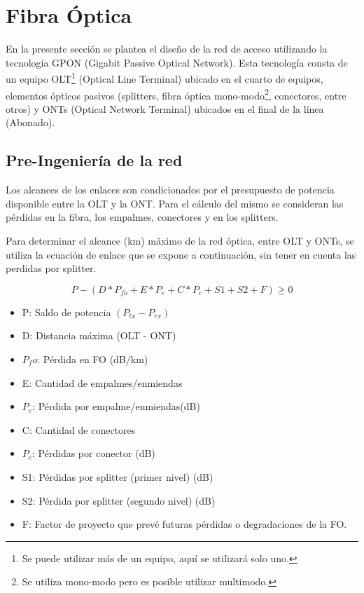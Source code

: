 \documentclass[12pt,a4paper]{book}
\begin{document}
\section{Fibra Óptica}\label{sec_fibra_optica_Acceso}

En la presente sección se plantea el diseño de la red de acceso utilizando la tecnología GPON (Gigabit Passive Optical Network). Esta tecnología consta de un equipo OLT\footnote{Se puede utilizar más de un equipo, aquí se utilizará solo uno.} (Optical Line Terminal) ubicado en el cuarto de equipos, elementos ópticos pasivos (splitters, fibra óptica mono-modo\footnote{Se utiliza mono-modo pero es posible utilizar multimodo.}, conectores, entre otros) y ONTs (Optical Network Terminal) ubicados en el final de la línea (Abonado).\medskip



\subsection{Pre-Ingeniería de la red}

Los alcances de los enlaces son condicionados por el presupuesto de
potencia disponible entre la OLT y la ONT. Para el cálculo del mismo se
consideran las pérdidas en la fibra, los empalmes, conectores y en los
splitters. \medskip

Para determinar el alcance (km) máximo de la red óptica, entre OLT y
ONTs, se utiliza la ecuación de enlace que se expone a continuación, sin
tener en cuenta las perdidas por splitter.

\begin{equation}\label{Ec_Presupuesto_enlaceFibra_Acc}
P-(D*P_{fo} + E*P_e + C*P_c + S1 + S2 + F) \geq 0
\end{equation}


\begin{itemize}
\item P: Saldo de potencia $(P_{tx} - P_{rx})$
\item D: Distancia máxima (OLT - ONT)
\item $P_fo$: Pérdida en FO (dB/km)
\item E: Cantidad de empalmes/enmiendas
\item $P_e$: Pérdida por empalme/enmiendas(dB)
\item C: Cantidad de conectores
\item $P_c$: Pérdidas por conector (dB)
\item S1: Pérdidas por splitter (primer nivel) (dB)
\item S2: Pérdida por splitter (segundo nivel) (dB)
\item F: Factor de proyecto que prevé futuras pérdidas o degradaciones
de la FO.
\end{itemize} \medskip
\end{document}
